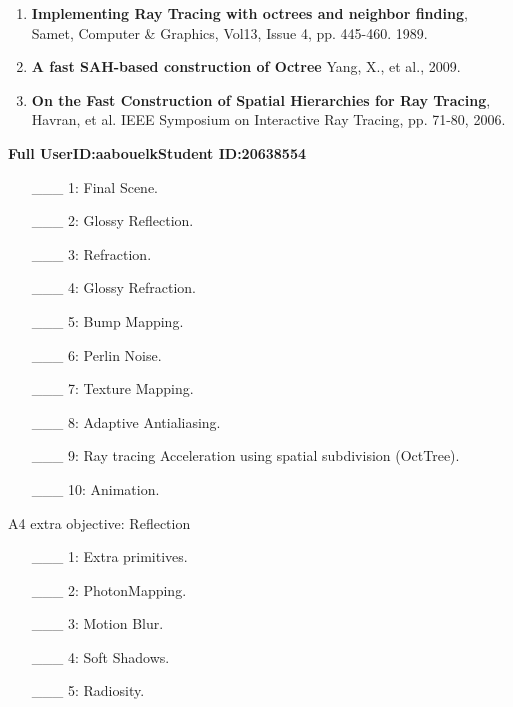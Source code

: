 \documentclass {article}
\begin{document}
\begin{description}
\begin{enumerate}
	\item {\bf Implementing Ray Tracing with octrees and neighbor finding}, Samet, Computer \& Graphics, Vol13, Issue 4, pp. 445-460. 1989.
	
	\item {\bf A fast SAH-based construction of Octree} Yang, X., et al., 2009.
	
	\item {\bf On the Fast Construction of Spatial Hierarchies for Ray Tracing}, Havran, et al. IEEE Symposium on Interactive Ray Tracing, pp. 71-80, 2006.
	
     \end{enumerate}

\end{description}
\newpage



{\hfill{\bf Full UserID:aabouelk}\hfill{\bf Student ID:20638554}\hfill}

\begin{enumerate}
     \item[\_\_\_ 1:]  Final Scene.

     \item[\_\_\_ 2:]  Glossy Reflection.

     \item[\_\_\_ 3:]  Refraction.

     \item[\_\_\_ 4:]  Glossy Refraction.

     \item[\_\_\_ 5:]  Bump Mapping.

     \item[\_\_\_ 6:]  Perlin Noise.

     \item[\_\_\_ 7:]  Texture Mapping.

     \item[\_\_\_ 8:]  Adaptive Antialiasing.

     \item[\_\_\_ 9:]  Ray tracing Acceleration using spatial subdivision (OctTree).

     \item[\_\_\_ 10:]  Animation.
\end{enumerate}

 A4 extra objective: Reflection\\
 
 \begin{enumerate}
     \item[\_\_\_ 1:]  Extra primitives.

     \item[\_\_\_ 2:]  PhotonMapping.

     \item[\_\_\_ 3:]  Motion Blur.

     \item[\_\_\_ 4:]  Soft Shadows.

     \item[\_\_\_ 5:]  Radiosity.
\end{enumerate}

 
\end{document}
